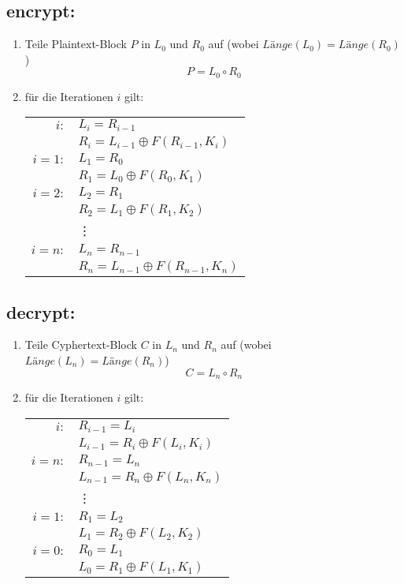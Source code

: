 \subsection*{encrypt:}
\begin{enumerate}
  \item Teile Plaintext-Block $P$ in $L_0$ und $R_0$ auf (wobei $Länge(L_0) = Länge(R_0)$)
$$ P = L_0 \circ R_0 $$
  \item für die Iterationen $i$ gilt:

  \begin{tabular}{rl}
  	$i:$ & $ L_i = R_{i-1} $ \\
  	            &  $ R_i = L_{i-1} \oplus F( R_{i-1}, K_i ) $ \\ \hline
  	$i = 1:$ & $L_1 = R_0$ \\
  	            &  $R_1 = L_0 \oplus F(R_0, K_1)$ \\
  	$i = 2:$ & $L_2 = R_1$ \\
  	            &  $R_2 = L_1 \oplus F(R_1, K_2)$ \\
  	  & \vdots \\
  	 $i = n:$ & $ L_n = R_{n-1} $ \\
  	            &  $ R_n = L_{n-1} \oplus F( R_{n-1}, K_n ) $ \\
	\end{tabular}
\end{enumerate}

\subsection*{decrypt:}
\begin{enumerate}
  \item Teile Cyphertext-Block $C$ in $L_n$ und $R_n$ auf (wobei $Länge(L_n) = Länge(R_n)$)
$$ C = L_n \circ R_n $$
  \item für die Iterationen $i$ gilt:

  \begin{tabular}{rl}
  	$i:$ &  $ R_{i-1} = L_i $ \\
  	            & $ L_{i-1} = R_{i} \oplus F( L_{i}, K_i ) $ \\ \hline
  	$i = n:$ &  $ R_{n-1} = L_n $ \\
  	            & $ L_{n-1} = R_{n} \oplus F( L_{n}, K_n ) $ \\
  	  & \vdots \\
  	$i = 1:$ &  $ R_{1} = L_2 $ \\
  	            & $ L_{1} = R_{2} \oplus F( L_{2}, K_2 ) $ \\
  	$i = 0:$ &  $ R_{0} = L_1 $ \\
  	            & $ L_{0} = R_{1} \oplus F( L_{1}, K_1 ) $ \\
	\end{tabular}
\end{enumerate}


